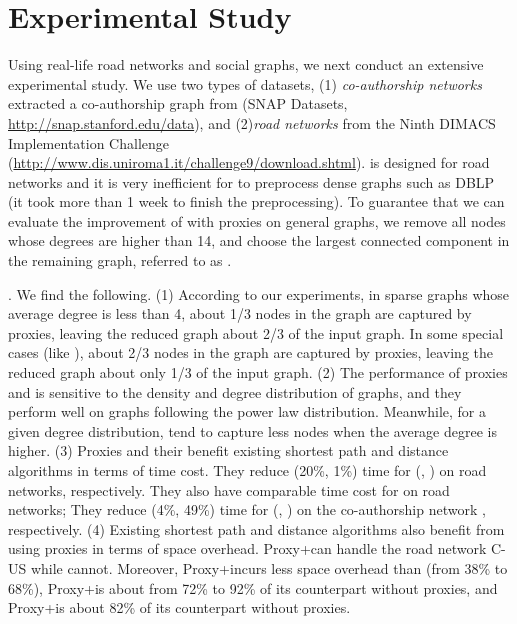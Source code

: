 \section{Experimental Study}
\label{sec-expt}


Using real-life road networks and social graphs, we next conduct an extensive experimental study. 
We use two types of datasets, (1) {\em co-authorship networks} extracted a co-authorship graph from \dblp (SNAP Datasets, \url{http://snap.stanford.edu/data}),
 and (2){\em road networks} from the Ninth DIMACS
Implementation Challenge ({\url{http://www.dis.uniroma1.it/challenge9/download.shtml}}).
\tnr is designed for road networks and it is very inefficient for \tnr to preprocess dense graphs such as DBLP (it took more than 1 week to finish the preprocessing). To guarantee that we can evaluate the improvement of \tnr with proxies on general graphs, we remove all nodes whose degrees are higher than 14, and choose the largest connected component in the remaining graph, referred to as \dblpone.

.
We find the following. (1) According to our experiments, in sparse graphs whose average degree is less than 4, about 1/3 nodes in the graph are captured by proxies, leaving the reduced graph about 2/3 of the input graph. In some special cases (like \dblpone), about 2/3 nodes in the graph are captured by proxies, leaving the reduced graph about only 1/3 of the input graph. 
(2) The performance of proxies and \dras is sensitive to the density and degree distribution of graphs, and they perform well on graphs following the power law distribution. Meanwhile, for a given degree distribution, \dras tend to capture less nodes when the average degree is higher. (3) Proxies and their \dras benefit existing shortest path and distance algorithms in terms of time cost. They reduce (20\%, 1\%) time for (\arcflag, \ah) on road networks, respectively. They also have comparable time cost for \tnr on road networks; They reduce (4\%, 49\%) time for (\arcflag, \tnr) on the co-authorship network \dblpone, respectively. (4) Existing shortest path and distance algorithms also benefit from using proxies in terms of space overhead. Proxy+\tnr can handle the road network C-US while \tnr cannot. Moreover, Proxy+\arcflag incurs less space overhead than \arcflag (from 38\% to 68\%), Proxy+\tnr is about from 72\% to 92\% of its counterpart without proxies, and Proxy+\ah is about 82\% of its counterpart without proxies.

